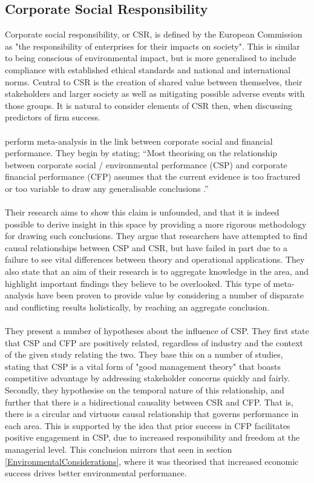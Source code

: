 \subsection{Corporate Social Responsibility}
{Corporate social responsibility, or CSR, is defined by the European Commission as "the responsibility of enterprises for their impacts on society". This is similar to being conscious of environmental impact, but is more generalised to include compliance with established ethical standards and national and international norms. Central to CSR is the creation of shared value between themselves, their stakeholders and larger society as well as mitigating possible adverse events with those groups. It is natural to consider elements of CSR then, when discussing predictors of firm success. \\\\
\cite{orlitzky2003corporate} perform meta-analysis in the link between corporate social and financial performance. They begin by stating;
``Most theorising on the relationship between corporate social / environmental performance (CSP) and corporate financial performance (CFP) assumes that the current evidence is too fractured or too variable to draw any generalisable conclusions \cite{orlitzky2003corporate}.''\\\\
Their research aims to show this claim is unfounded, and that it is indeed possible to derive insight in this space by providing a more rigorous methodology for drawing such conclusions. They argue that researchers have attempted to find causal relationships between CSP and CSR, but have failed in part due to a failure to see vital differences between theory and operational applications. They also state that an aim of their research is to aggregate knowledge in the area, and highlight important findings they believe to be overlooked. This type of meta-analysis have been proven to provide value by considering a number of disparate and conflicting results holistically, by reaching an aggregate conclusion.\\\\
They present a number of hypotheses about the influence of CSP. They first state that CSP and CFP are positively related, regardless of industry and the context of the given study relating the two. They base this on a number of studies, stating that CSP is a vital form of "good management theory" that boasts competitive advantage by addressing stakeholder concerns quickly and fairly.  Secondly, they hypothesise on the temporal nature of this relationship, and further that there is a bidirectional causality between CSR and CFP. That is, there is a circular and virtuous causal relationship that governs performance in each area. This is supported by the idea that prior success in CFP facilitates positive engagement in CSP, due to increased responsibility and freedom at the managerial level. This conclusion mirrors that seen in section \ref{EnvironmentalConsiderations}, where it was theorised that increased economic success drives better environmental performance.\\\\
}
